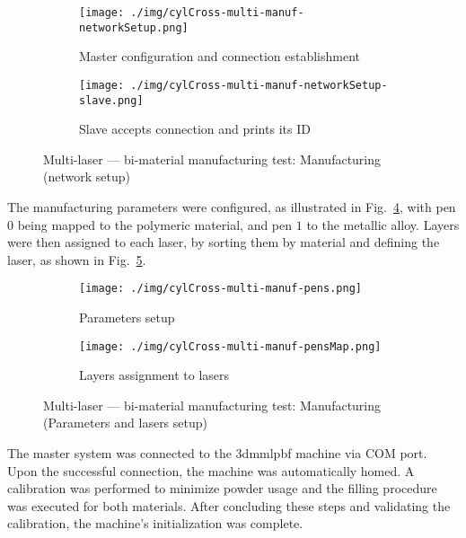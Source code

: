 \begin{figure}[htbp!]
%
  \centering
  \begin{subfigure}[t]{0.80\textwidth}
    \centering
  \texttt{[image: ./img/cylCross-multi-manuf-networkSetup.png]}
  \caption{Master configuration and connection establishment}%
  \label{fig:cylCross-multi-manuf-networkSetup-master}
\end{subfigure}
%
  \begin{subfigure}[t]{.80\textwidth}
  \centering
    \texttt{[image: ./img/cylCross-multi-manuf-networkSetup-slave.png]}
  \caption{Slave accepts connection and prints its ID}%
  \label{fig:cylCross-multi-manuf-networkSetup-slave}
  \end{subfigure}
  \caption{Multi-laser --- bi-material manufacturing test: Manufacturing
    (network setup)}%
  \label{fig:cylCross-multi-networkSetup}
\end{figure}
%

The manufacturing parameters were configured, as illustrated in
Fig.~\ref{fig:cylCross-multi-manuf-pens}, with pen $0$ being mapped to the
polymeric material, and pen $1$ to the metallic alloy.
Layers were then assigned to each laser, by sorting them by material and
defining the laser, as shown in Fig.~\ref{fig:cylCross-multi-manuf-pensMap}.

\begin{figure}[htbp!]
%
  \centering
  \begin{subfigure}[t]{0.48\textwidth}
    \centering
  \texttt{[image: ./img/cylCross-multi-manuf-pens.png]}
  \caption{Parameters setup}%
  \label{fig:cylCross-multi-manuf-pens}
\end{subfigure}
%
  \begin{subfigure}[t]{.48\textwidth}
  \centering
    \texttt{[image: ./img/cylCross-multi-manuf-pensMap.png]}
  \caption{Layers assignment to lasers}%
  \label{fig:cylCross-multi-manuf-pensMap}
  \end{subfigure}
  \caption{Multi-laser --- bi-material manufacturing test: Manufacturing
    (Parameters and lasers setup)}%
  \label{fig:cylCross-multi-manuf-pensLasers}
\end{figure}

The master system
was connected to the \gls{3dmmlpbf} machine via COM port.
Upon the successful connection, the machine was automatically homed.
A calibration was performed to minimize powder usage and the filling procedure was executed for both materials. 
After concluding these
steps and validating the calibration, the machine's initialization was complete.

